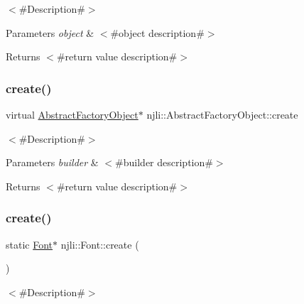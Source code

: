 $<$\#\+Description\#$>$


\begin{DoxyParams}{Parameters}
{\em object} & $<$\#object description\#$>$\\
\hline
\end{DoxyParams}
\begin{DoxyReturn}{Returns}
$<$\#return value description\#$>$ 
\end{DoxyReturn}
\mbox{\label{classnjli_1_1_font_a83a8876ae63b92804004cf3febe76573}} 
\subsubsection{\texorpdfstring{create()}{create()}\hspace{0.1cm}{\footnotesize\ttfamily [1/3]}}
{\footnotesize\ttfamily virtual \mbox{\hyperlink{classnjli_1_1_abstract_factory_object}{Abstract\+Factory\+Object}}$\ast$ njli\+::\+Abstract\+Factory\+Object\+::create}

$<$\#\+Description\#$>$


\begin{DoxyParams}{Parameters}
{\em builder} & $<$\#builder description\#$>$\\
\hline
\end{DoxyParams}
\begin{DoxyReturn}{Returns}
$<$\#return value description\#$>$ 
\end{DoxyReturn}
\mbox{\label{classnjli_1_1_font_aee1458a34b7adc94843a0837ff3bf1e4}} 
\subsubsection{\texorpdfstring{create()}{create()}\hspace{0.1cm}{\footnotesize\ttfamily [2/3]}}
{\footnotesize\ttfamily static \mbox{\hyperlink{classnjli_1_1_font}{Font}}$\ast$ njli\+::\+Font\+::create (\begin{DoxyParamCaption}{ }\end{DoxyParamCaption})\hspace{0.3cm}{\ttfamily [static]}}

$<$\#\+Description\#$>$

